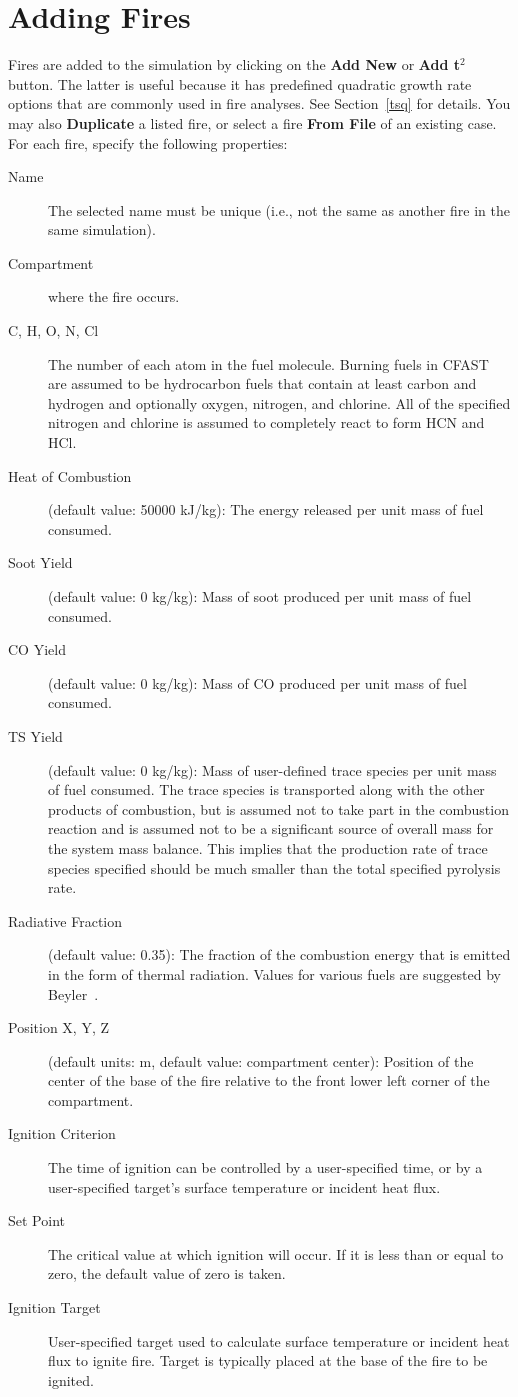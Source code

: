 \section{Adding Fires}
\label{sec:fire_inputs}

Fires are added to the simulation by clicking on the {\bf Add New} or {\bf Add t$^2$} button. The latter is useful because it has predefined quadratic growth rate options that are commonly used in fire analyses. See Section~\ref{tsq} for details. You may also {\bf Duplicate} a listed fire, or select a fire {\bf From File} of an existing case. For each fire, specify the following properties:
\begin{description}
\item[Name] The selected name must be unique (i.e., not the same as another fire in the same simulation).
\item[Compartment] where the fire occurs.
\item[C, H, O, N, Cl] The number of each atom in the fuel molecule. Burning fuels in CFAST are assumed to be hydrocarbon fuels that contain at least carbon and hydrogen and optionally oxygen, nitrogen, and chlorine. All of the specified nitrogen and chlorine is assumed to completely react to form HCN and HCl.
\item[Heat of Combustion] (default value: 50000 kJ/kg): The energy released per unit mass of fuel consumed.
\item[Soot Yield] (default value: 0 kg/kg): Mass of soot produced per unit mass of fuel consumed.
\item[CO Yield] (default value: 0 kg/kg): Mass of CO produced per unit mass of fuel consumed.
\item[TS Yield] (default value: 0 kg/kg): Mass of user-defined trace species per unit mass of fuel consumed. The trace species is transported along with the other products of combustion, but is assumed not to take part in the combustion reaction and is assumed not to be a significant source of overall mass for the system mass balance. This implies that the production rate of trace species specified should be much smaller than the total specified pyrolysis rate.
\item[Radiative Fraction] (default value: 0.35): The fraction of the combustion energy that is emitted in the form of thermal radiation. Values for various fuels are suggested by Beyler~\cite{Beyler2:SFPE}.
\item[Position X, Y, Z] (default units: m, default value: compartment center): Position of the center of the base of the fire relative to the front lower left corner of the compartment.
\item[Ignition Criterion] The time of ignition can be controlled by a user-specified time, or by a user-specified target's surface temperature or incident heat flux.
\item[Set Point] The critical value at which ignition will occur. If it is less than or equal to zero, the default value of zero is taken.
\item[Ignition Target] User-specified target used to calculate surface temperature or incident heat flux to ignite fire. Target is typically placed at the base of the fire to be ignited.
\end{description}

